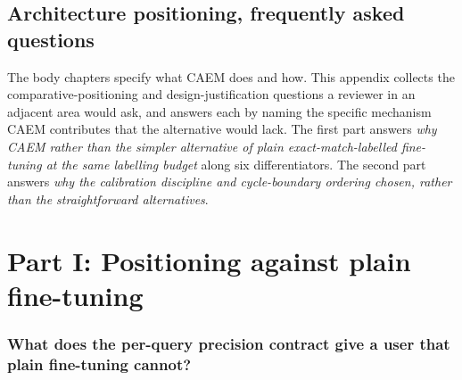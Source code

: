 %

\chapter[Architecture positioning]{Architecture positioning, frequently asked questions}
\label{app:positioning-qa}

The body chapters specify what CAEM does and how. This appendix collects the comparative-positioning and design-justification questions a reviewer in an adjacent area would ask, and answers each by naming the specific mechanism CAEM contributes that the alternative would lack. The first part answers \emph{why CAEM rather than the simpler alternative of plain exact-match-labelled fine-tuning at the same labelling budget} along six differentiators. The second part answers \emph{why the calibration discipline and cycle-boundary ordering chosen, rather than the straightforward alternatives}.

\part*{Part I: Positioning against plain fine-tuning}


\section[Per-query precision contract]{What does the per-query precision contract give a user that plain fine-tuning cannot?}
\label{app:qa-precision-contract}

